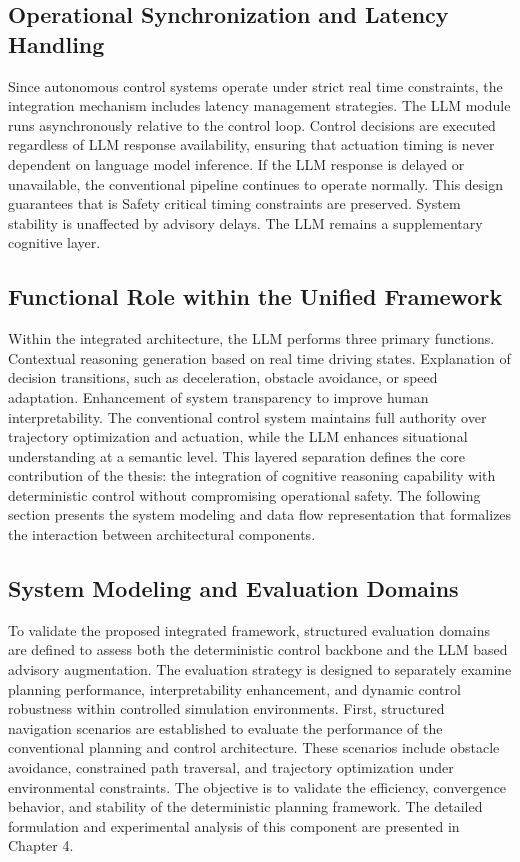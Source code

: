 \documentclass[a4paper,12pt,one side]{report}
\theoremstyle{definition}
\begin{document}
\begin{itemize}
\subsection{Operational Synchronization and Latency Handling}
Since autonomous control systems operate under strict real time constraints, the integration mechanism includes latency management strategies. The LLM module runs asynchronously relative to the control loop. Control decisions are executed regardless of LLM response availability, ensuring that actuation timing is never dependent on language model inference.
If the LLM response is delayed or unavailable, the conventional pipeline continues to operate normally. This design guarantees that is Safety critical timing constraints are preserved. System stability is unaffected by advisory delays. The LLM remains a supplementary cognitive layer.
\subsection{Functional Role within the Unified Framework}
Within the integrated architecture, the LLM performs three primary functions. Contextual reasoning generation based on real time driving states. Explanation of decision transitions, such as deceleration, obstacle avoidance, or speed adaptation. Enhancement of system transparency to improve human interpretability.
The conventional control system maintains full authority over trajectory optimization and actuation, while the LLM enhances situational understanding at a semantic level. This layered separation defines the core contribution of the thesis: the integration of cognitive reasoning capability with deterministic control without compromising operational safety.
The following section presents the system modeling and data flow representation that formalizes the interaction between architectural components.
\subsection{System Modeling and Evaluation Domains}
To validate the proposed integrated framework, structured evaluation domains are defined to assess both the deterministic control backbone and the LLM based advisory augmentation. The evaluation strategy is designed to separately examine planning performance, interpretability enhancement, and dynamic control robustness within controlled simulation environments.
First, structured navigation scenarios are established to evaluate the performance of the conventional planning and control architecture. These scenarios include obstacle avoidance, constrained path traversal, and trajectory optimization under environmental constraints. The objective is to validate the efficiency, convergence behavior, and stability of the deterministic planning framework. The detailed formulation and experimental analysis of this component are presented in Chapter 4.


\end{itemize}
\end{document}
